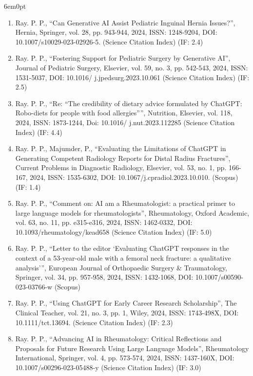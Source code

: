 \documentclass[11pt,a4paper]{moderncv}
\begin{document}
\begin{adjustwidth}{6em}{0pt}
\begin{enumerate}
		\item Ray. P. P., “Can Generative AI Assist Pediatric Inguinal Hernia Issues?”, Hernia, Springer, vol. 28, pp. 943-944, 2024, ISSN: 1248-9204, DOI: 10.1007/s10029-023-02926-5. (Science Citation Index) (IF: 2.4)
		
		\item Ray. P. P., “Fostering Support for Pediatric Surgery by Generative AI”, Journal of Pediatric Surgery, Elsevier, vol. 59, no. 3, pp. 542-543, 2024, ISSN: 1531-5037, DOI: 10.1016/ j.jpedsurg.2023.10.061 (Science Citation Index) (IF: 2.5)
		
		\item Ray. P. P., “Re: “The credibility of dietary advice formulated by ChatGPT: Robo-diets for people with food allergies””, Nutrition, Elsevier, vol. 118, 2024, ISSN: 1873-1244, Doi: 10.1016/ j.nut.2023.112285 (Science Citation Index) (IF: 4.4)
		
		\item Ray. P. P., Majumder, P., “Evaluating the Limitations of ChatGPT in Generating Competent Radiology Reports for Distal Radius Fractures”, Current Problems in Diagnostic Radiology, Elsevier, vol. 53, no. 1, pp. 166-167, 2024, ISSN: 1535-6302, DOI: 10.1067/j.cpradiol.2023.10.010. (Scopus) (IF: 1.4)
		
		\item Ray. P. P., “Comment on: AI am a Rheumatologist: a practical primer to large language models for rheumatologists”, Rheumatology, Oxford Academic, vol. 63, no. 11, pp. e315-e316, 2024, ISSN: 1462-0332, DOI: 10.1093/rheumatology/kead658 (Science Citation Index) (IF: 5.0)
		
		\item Ray. P. P., “Letter to the editor ‘Evaluating ChatGPT responses in the context of a 53-year-old male with a femoral neck fracture: a qualitative analysis’”, European Journal of Orthopaedic Surgery \& Traumatology, Springer, vol. 34, pp. 957-958, 2024, ISSN: 1432-1068, DOI: 10.1007/s00590-023-03766-w (Scopus) 
		
		\item Ray. P. P., “Using ChatGPT for Early Career Research Scholarship”, The Clinical Teacher, vol. 21, no. 3, pp. 1, Wiley, 2024, ISSN: 1743-498X, DOI: 10.1111/tct.13694. (Science Citation Index) (IF: 2.3)
		
		\item Ray. P. P., “Advancing AI in Rheumatology: Critical Reflections and Proposals for Future Research Using Large Language Models”, Rheumatology International, Springer, vol. 4, pp. 573-574, 2024, ISSN: 1437-160X, DOI: 10.1007/s00296-023-05488-y (Science Citation Index) (IF: 3.0)
		

\end{enumerate}
\end{adjustwidth}
\end{document}
